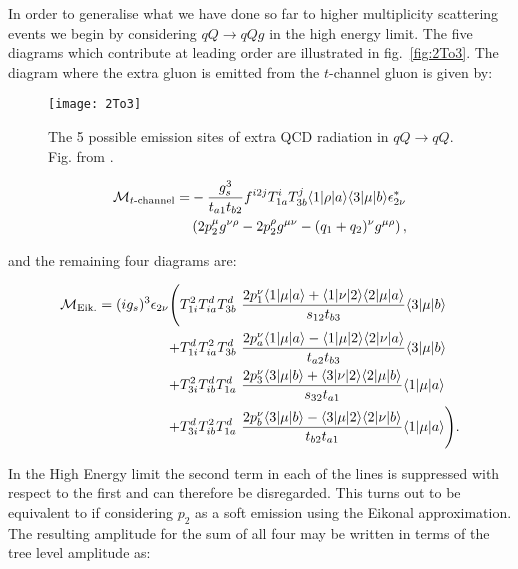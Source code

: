 	In order to generalise what we have done so far to higher multiplicity scattering events we begin
	by considering $qQ\rightarrow qQg$ in the high energy limit.  The five diagrams which contribute at
	leading order are illustrated in fig.~\eqref{fig:2To3}.  The diagram
	where the extra gluon is emitted from the $t$-channel gluon is given by:

	\begin{figure}[hbt]
		\begin{center}
		\texttt{[image: 2To3]}
		\caption{The 5 possible emission sites of extra QCD radiation in $qQ\rightarrow qQ$.
		Fig. from \cite{Andersen:2009nu}.}
		\label{fig:2To3}
		\end{center}
	\end{figure}

	\begin{align}
	\begin{split}
		\mathcal{M}_{t\text{-channel}} = &-\frac{g_s^3}{t_{a1}t_{b2}}f^{i2j}T^i_{1a}T^j_{3b}\langle 1 | \rho | a \rangle\langle 3 | \mu | b \rangle
		\epsilon^*_{2\nu}\\&\left(2p_2^\mu g^{\nu\rho} - 2p_2^\rho g^{\mu\nu} - (q_1 + q_2)^\nu g^{\mu\rho} \right),
		\label{eqn:mtchannel}
	\end{split}
	\end{align}

	and the remaining four diagrams are:

	\begin{align}
	\begin{split}
	    \mathcal{M}_{\text{Eik.}} = (ig_s)^3 \epsilon_{2\nu} \Bigg(
	     &T^2_{1i}T^d_{ia}T^d_{3b}\ \frac{2p_1^\nu\langle 1 | \mu | a \rangle + \langle 1 | \nu | 2 \rangle\langle 2 | \mu | a \rangle} {s_{12}t_{b3}} \langle 3 | \mu | b \rangle \\
	    +&T^d_{1i}T^2_{ia}T^d_{3b}\ \frac{2p_a^\nu\langle 1 | \mu | a \rangle - \langle 1 | \mu | 2 \rangle\langle 2 | \nu | a \rangle} {t_{a2}t_{b3}} \langle 3 | \mu | b \rangle \\
	    +&T^2_{3i}T^d_{ib}T^d_{1a}\ \frac{2p_3^\nu\langle 3 | \mu | b \rangle + \langle 3 | \nu | 2 \rangle\langle 2 | \mu | b \rangle} {s_{32}t_{a1}} \langle 1 | \mu | a \rangle\\
	    +&T^d_{3i}T^2_{ib}T^d_{1a}\ \frac{2p_b^\nu\langle 3 | \mu | b \rangle - \langle 3 | \mu | 2 \rangle\langle 2 | \nu | b \rangle} {t_{b2}t_{a1}} \langle 1 | \mu | a \rangle\Bigg).
		\label{eq:fulltree}
	\end{split}
	\end{align}

	In the High Energy limit the second term in each of the lines is suppressed with respect to the
	first and can therefore be disregarded.  This turns out to be equivalent to if considering
	$p_2$ as a soft emission using the Eikonal approximation.  The resulting amplitude for the sum
	of all four may be written in terms of the tree level amplitude as:

